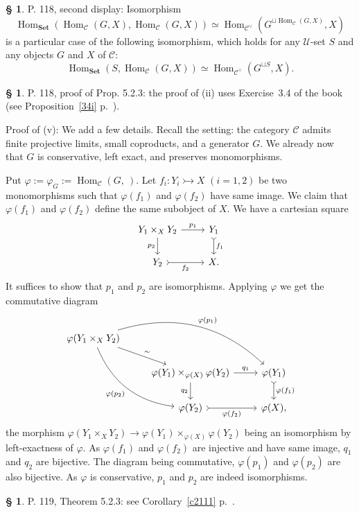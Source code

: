 \documentclass[12pt]{article}%
\theoremstyle{remark}
\theoremstyle{definition}
\newtheorem{s}[thm]{\S}%
\newcommand{\C}{\mathcal C}
\newcommand{\U}{\mathcal U}
\newcommand{\Set}{\mathbf{Set}}
\newcommand{\pp}{\varphi}
\newcommand{\mono}{\rightarrowtail}%
\DeclareMathOperator{\Hom}{Hom}%
\begin{document}
%

\begin{s}
P. 118, second display: Isomorphism 
$$
\Hom_{\Set}(\Hom_\C(G,X),\Hom_\C(G,X))\simeq\Hom_{\C^\vee}(G^{\sqcup\Hom_\C(G,X)},X)
$$ 
is a particular case of the following isomorphism, which holds for any $\U$-set $S$ and any objects $G$ and $X$ of $\C$: 
$$
\Hom_{\Set}(S,\Hom_\C(G,X))\simeq\Hom_{\C^\vee}(G^{\sqcup S},X).
$$ 
\end{s}

%

\begin{s}
P. 118, proof of Prop. 5.2.3: the proof of (ii) uses Exercise~3.4 of the book (see Proposition~\ref{34i} p.~\pageref{34i}). 

Proof of (v): We add a few details. Recall the setting: the category $\C$ admits finite projective limits, small coproducts, and a generator $G$. We already now that $G$ is conservative, left exact, and preserves monomorphisms. 

Put $\pp:=\pp_G:=\Hom_\C(G,\ )$. Let $f_i:Y_i\mono X$ $(i=1,2)$ be two monomorphisms such that $\pp(f_1)$ and $\pp(f_2)$ have same image. We claim that $\pp(f_1)$ and $\pp(f_2)$ define the same subobject of $X$. We have a cartesian square
$$
\begin{tikzcd}
Y_1\times_XY_2\ar{r}{p_1}\ar{d}[swap]{p_2}&Y_1\ar[tail]{d}{f_1}\\ 
Y_2\ar[tail]{r}[swap]{f_2}&X.
\end{tikzcd}
$$ 
It suffices to show that $p_1$ and $p_2$ are isomorphisms. Applying $\pp$ we get the commutative diagram 
$$
\begin{tikzcd}
\pp(Y_1\times_XY_2)\ar{rd}{\sim}\ar[bend left]{rrd}{\pp(p_1)}\ar[bend right]{rdd}[swap]{\pp(p_2)}\\ 
{}&\pp(Y_1)\times_{\pp(X)}\pp(Y_2)\ar{r}{q_1}\ar{d}[swap]{q_2}&\pp(Y_1)\ar[tail]{d}{\pp(f_1)}\\ 
{}&\pp(Y_2)\ar[tail]{r}[swap]{\pp(f_2)}&\pp(X),
\end{tikzcd}
$$ 
the morphism $\pp(Y_1\times_XY_2)\to\pp(Y_1)\times_{\pp(X)}\pp(Y_2)$ being an isomorphism by left-exactness of $\pp$. As $\pp(f_1)$ and $\pp(f_2)$ are injective and have same image, $q_1$ and $q_2$ are bijective. The diagram being commutative, $\pp(p_1)$ and $\pp(p_2)$ are also bijective. As $\pp$ is conservative,  $p_1$ and $p_2$ are indeed isomorphisms.
\end{s}

%

\begin{s}
P. 119, Theorem 5.2.3: see Corollary~\ref{c2111} p.~\pageref{c2111}.
\end{s}
\end{document}
